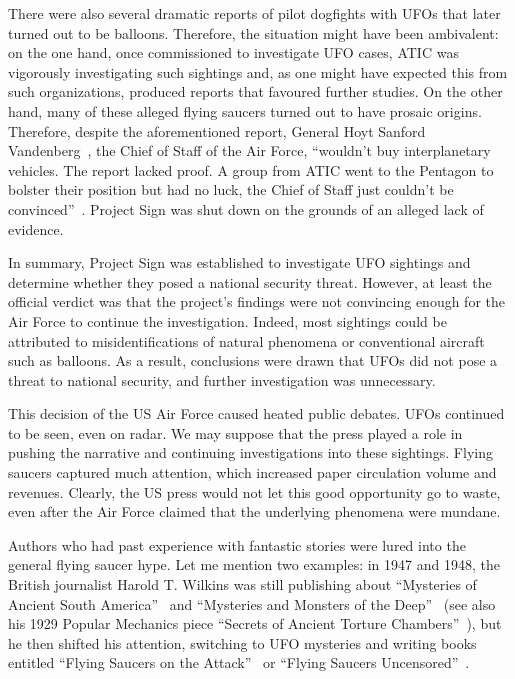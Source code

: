 There were also several dramatic reports of pilot dogfights with UFOs that later turned out to be balloons.
Therefore, the situation might have been ambivalent: on the one hand, once commissioned to investigate UFO cases,
ATIC was vigorously investigating such sightings and, as one might have expected this from such organizations,
produced reports that favoured further studies.
On the other hand, many of these alleged flying saucers turned out to have prosaic origins.
Therefore, despite the aforementioned report,
General Hoyt Sanford Vandenberg~\cite{VandenbergUSAF}, the Chief of Staff of the Air Force,
``wouldn't buy interplanetary vehicles. The report lacked proof. A group from ATIC went
to the Pentagon to bolster their position but had no luck, the Chief of Staff just couldn't be convinced''~\cite[Chapter~3]{Ruppelt2011May}.
Project Sign was shut down on the grounds of an alleged lack of evidence.

In summary, Project Sign was established to investigate UFO sightings and determine whether they posed a national security threat.
However, at least the official verdict was that the project's findings were not convincing enough for the Air Force
to continue the investigation.
Indeed, most sightings could be attributed to misidentifications of natural phenomena or conventional aircraft such as balloons.
As a result, conclusions were drawn that UFOs did not pose a threat to national security, and further investigation was unnecessary.

This decision of the US Air Force caused heated public debates. UFOs continued to be seen, even on radar.
We may suppose that the press played a role in pushing the narrative and continuing investigations into these sightings.
Flying saucers captured much attention, which increased paper circulation volume and revenues.
Clearly, the US press would not let this good opportunity go to waste,
even after the Air Force claimed that the underlying phenomena were mundane.

Authors who had past experience with fantastic stories were lured into the general flying saucer hype. Let me mention two examples: in 1947 and 1948, the British journalist Harold T. Wilkins was still publishing about
``Mysteries of Ancient South America''~\cite{Wilkins1946} and ``Mysteries and Monsters of the Deep''~\cite{Wilkins2017Aug}
(see also his 1929 Popular Mechanics piece ``Secrets of Ancient Torture Chambers''~\cite{Wilkins1929}),
but he then shifted his attention, switching to UFO mysteries and writing books entitled
``Flying Saucers on the Attack''~\cite{Wilkins1954Jan} or ``Flying Saucers Uncensored''~\cite{Wilkins1955}.

